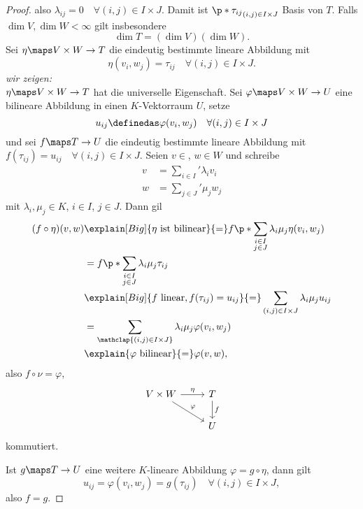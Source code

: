 \begin{proof}
  also \( \lambda_{ij}=0\quad \forall (i,j)\in I\times J \). Damit ist \( \p*{\tau_{ij}}_{(i,j)\in I\times J} \) Basis von \( T \). Falls \( \dim{V},\dim{W}<\infty \) gilt insbesondere
  \begin{equation*}
    \dim{T}=(\dim{V})(\dim{W}).
  \end{equation*}
  Sei \( \eta\maps V\times W\to T \) die eindeutig bestimmte lineare Abbildung mit
  \begin{equation*}
    \eta(v_i,w_j)=\tau_{ij}\quad \forall (i,j)\in I\times J.
  \end{equation*}
  \emph{wir zeigen:}\\
  \( \eta\maps V\times W\to T \) hat die universelle Eigenschaft. Sei \( \varphi\maps V\times W\to U \) eine bilineare Abbildung in einen \( K \)-Vektorraum \( U \), setze
  \begin{equation*}
    u_{ij}\definedas \varphi(v_i,w_j)\quad \forall (i,j)\in I\times J
  \end{equation*}
  und sei \( f\maps T\to U \) die eindeutig bestimmte lineare Abbildung mit \( f(\tau_{ij})=u_{ij} \quad \forall (i,j)\in I\times J\). Seien \( v\in  \), \( w\in W \) und schreibe 
  \begin{align*}
    v&=\sum_{i\in I}'\lambda_i v_i\\
    w&=\sum_{j\in J}'\mu_j w_j
  \end{align*}
  mit \( \lambda_i,\mu_j\in K \), \( i\in I \), \( j\in J \). Dann gil
  \begin{align*}
    (f\circ \eta)(v,w)&\explain[Big]{\eta \text{ ist bilinear}}{=}f\p*{\sum_{\substack{i\in I\\ j\in J}}\lambda_i \mu_j \eta(v_i,w_j)}\\
    &=f\p*{\sum_{\substack{i\in I\\ j\in J}}\lambda_i \mu_j \tau_{ij}}\\
    &\explain[Big]{f \text{ linear},f(\tau_{ij})=u_{ij}}{=}\sum_{(i,j)\in I\times J}\lambda_i \mu_j u_{ij}\\
    &=\sum_{\mathclap{(i,j)\in I\times J}}\lambda_i \mu_j \varphi(v_i,w_j)\\
    &\explain{\varphi \text{ bilinear}}{=}\varphi(v,w),
  \end{align*}
  also \( f\circ \nu=\varphi \), \dh
  \begin{equation*}
    \begin{tikzcd}
      V\times W\arrow[r,"\eta"]\arrow[dr,"\varphi"]&T\arrow[d,"f"]\\
      &U
    \end{tikzcd}
  \end{equation*}
  kommutiert.

  Ist \( g\maps T\to U \) eine weitere \( K \)-lineare Abbildung \( \varphi=g\circ \eta \), dann gilt
  \begin{equation*}
    u_{ij}=\varphi(v_i,w_j)=g(\tau_{ij})\quad \forall (i,j)\in I\times J,
  \end{equation*}
  also \( f=g \).
\end{proof}
